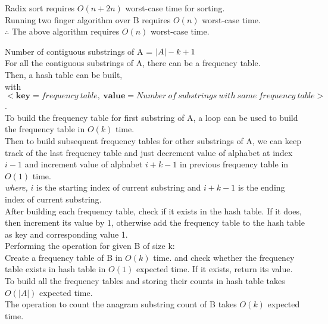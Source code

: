 \documentclass[12pt,twoside]{article}
\begin{document}
\begin{problems}
\begin{problemparts}
Radix sort requires $O(n + 2n)$ worst-case time for sorting. \\
Running two finger algorithm over B requires $O(n)$ worst-case time. \\

$\therefore$ The above algorithm requires $O(n)$ worst-case time.

\end{problemparts}

\newpage

\problem  %

\begin{problemparts}
\problempart %
Number of contiguous substrings of A = $\left| A\right| - k + 1$ \\

For all the contiguous substrings of A, there can be a frequency table. \\
Then, a hash table can be built, \\
with $<\textbf{key} = frequency\ table,\ \textbf{value} = Number\ of\ substrings\ with\ same\ frequency\ table>$. \\

To build the frequency table for first substring of A, a loop can be used to build the frequency table in $O(k)$ time. \\
Then to build subsequent frequency tables for other substrings of A, we can keep track of the last frequency table and just decrement value of alphabet at index $i-1$ and increment value of alphabet $i+k-1$ in previous frequency table in $O(1)$ time. \\ 
\textit{where,} $i$ is the starting index of current substring and $i+k-1$ is the ending index of current substring. \\

After building each frequency table, check if it exists in the hash table. If it does, then increment its value by 1, otherwise add the frequency table to the hash table as key and corresponding value 1. \\

Performing the operation for given B of size k: \\
Create a frequency table of B in $O(k)$ time. and check whether the frequency table exists in hash table in $O(1)$ expected time. If it exists, return its value. \\

To build all the frequency tables and storing their counts in hash table takes $O(|A|)$ expected time. \\
The operation to count the anagram substring count of B takes $O(k)$ expected time.\\ 
\problempart %


\end{problemparts}
\end{problems}
\end{document}
